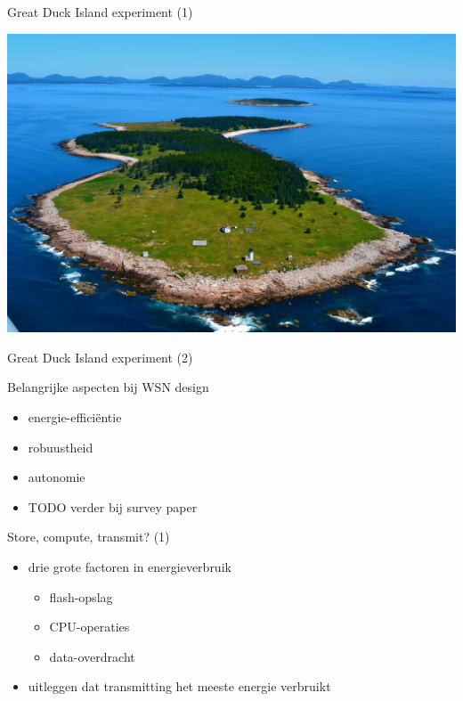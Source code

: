 \documentclass[presentation, bigger]{beamer}
\begin{document}
\begin{frame}[label=sec-1-3]{Great Duck Island experiment (1)}

\includegraphics[width=\textwidth,keepaspectration=true]{gdi/gdi.jpg}

\end{frame}

\begin{frame}[label=sec-1-4]{Great Duck Island experiment (2)}

\end{frame}
\begin{frame}[label=sec-1-5]{Belangrijke aspecten bij WSN design}
\begin{itemize}
\item energie-efficiëntie
\item robuustheid
\item autonomie
\item TODO verder bij survey paper
\end{itemize}
\end{frame}

\begin{frame}[label=sec-1-6]{Store, compute, transmit? (1)}
\begin{itemize}
\item drie grote factoren in energieverbruik
\begin{itemize}
\item flash-opslag
\item CPU-operaties
\item data-overdracht
\end{itemize}
\item uitleggen dat transmitting het meeste energie verbruikt
\end{itemize}
\end{frame}
\end{document}
